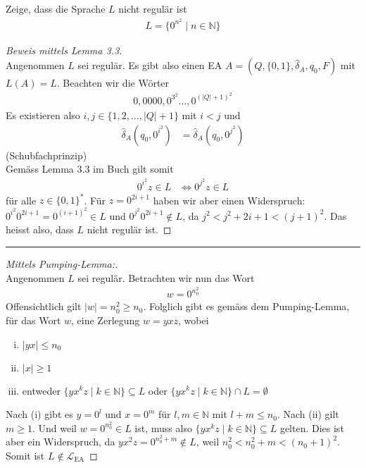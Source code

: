 \documentclass[a4paper,ngerman,12pt]{exam}
\begin{document}
\begin{questions}
\question
   Zeige, dass die Sprache $L$ nicht regulär ist
    \begin{align*}
      L = \{0^{n^2} \mid n \in \mathbb{N}\}
    \end{align*}
     \vspace{-2em}
    \begin{solutionorbox}[22em]
      \begin{proof}[Beweis mittels Lemma 3.3] $ $\\
    Angenommen $L$ sei regulär.
    Es gibt also einen EA $A = (Q, \{0, 1\}, \hat{\delta}_A, q_0, F)$ mit $L(A) = L$.
    Beachten wir die Wörter
    \begin{align*}
      0, 0000, 0^{3^2}\dots , 0^{(|Q|+1)^2}
    \end{align*}
    Es existieren also $i, j \in \{1, 2, \dots, |Q|+1\}$ mit $i < j$
    und
    \begin{align*}
      \hat{\delta}_A(q_0, 0^{i^2}) &= \hat{\delta}_A(q_0, 0^{j^2})
    \end{align*}
    (Schubfachprinzip)\\
    Gemäss Lemma 3.3 im Buch gilt somit
    \begin{align*}
      0^{i^2} z \in L &\iff 0^{j^2} z \in L
    \end{align*}
    für alle $z \in \{0, 1\}^*$. Für $z = 0^{2i+1}$ haben wir aber einen Widerspruch:
        $0^{i^2} 0^{2i + 1} = 0^{(i+1)^2} \in L$ und $0^{j^2} 0^{2i + 1} \not\in L$,
        da $j^2 < j^2 + 2i + 1 < (j+1)^2$.
        Das heisst also, dass
    $L$ nicht regulär ist.
      \end{proof}

      \hrule

      \begin{proof}[Mittels Pumping-Lemma:] $ $\\
        Angenommen $L$ sei regulär. Betrachten wir nun das Wort
        \begin{align*}
          w = 0^{n_0^2}
        \end{align*}
        Offensichtlich gilt $|w| = n_0^2  \geq n_0$.
        Folglich gibt es gemäss dem Pumping-Lemma, für das Wort $w$, eine Zerlegung
        $w = yxz$, wobei
        \begin{enumerate}[(i)]
          \item $|yx| \leq n_0$
          \item $|x| \geq 1$
          \item entweder $\{y x^k z \mid k \in \mathbb{N}\} \subseteq L$
            oder $\{y x^k z \mid k \in \mathbb{N}\} \cap L = \emptyset$
        \end{enumerate}
        Nach (i) gibt es $y = 0^l$ und $x = 0^m$ für $l,m \in \mathbb{N}$
        mit $l+m \leq n_0$. Nach (ii) gilt $m \geq 1$. Und weil
        $w = 0^{n_0^2} \in L$ ist, muss also
        $\{y x^k z \mid k \in \mathbb{N}\} \subseteq L$ gelten. Dies ist aber ein
        Widerspruch, da $yx^2z = 0^{n_0^2+m} \not\in L$, weil $n_0^2 < n_0^2 + m < (n_0+1)^2$.
        Somit ist
        $L \not\in \mathcal{L}_{\mathrm{EA}}$
      \end{proof}


\end{solutionorbox}
\end{questions}
\end{document}
